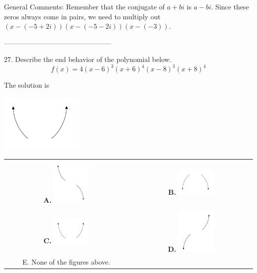 \documentclass{article}[14pt]
\begin{document}
General Comments: Remember that the conjugate of $a+bi$ is $a-bi$. Since these zeros always come in pairs, we need to multiply out $(x-(-5 + 2i))(x-(-5 - 2i))(x-(-3))$.

-----------------------------------------------

27. Describe the end behavior of the polynomial below.
$$ f(x) = 4(x - 6)^{3}(x + 6)^{4}(x - 8)^{3}(x + 8)^{4} $$ 

 
 The solution is  
 \begin{center} \includegraphics[width=0.3\textwidth]{../Figures/endBehaviorPositiveEvenB.png} \end{center}\begin{tabular}{|c|c|} 
\hline 
 & \tabularnewline 
 \textbf{A.} \includegraphics[width=0.3\textwidth]{../Figures/endBehaviorNegativeOddB.png} & \textbf{B.} \includegraphics[width=0.3\textwidth]{../Figures/endBehaviorNegativeEvenB.png} \tabularnewline 
\hline 
 & \tabularnewline 
 \textbf{C.} \includegraphics[width=0.3\textwidth]{../Figures/endBehaviorPositiveEvenB.png} & \textbf{D.} \includegraphics[width=0.3\textwidth]{../Figures/endBehaviorPositiveOddB.png} \tabularnewline 
\hline 
 E. None of the figures above. & \tabularnewline 
\hline 
 \end{tabular} 
 
\end{document}
